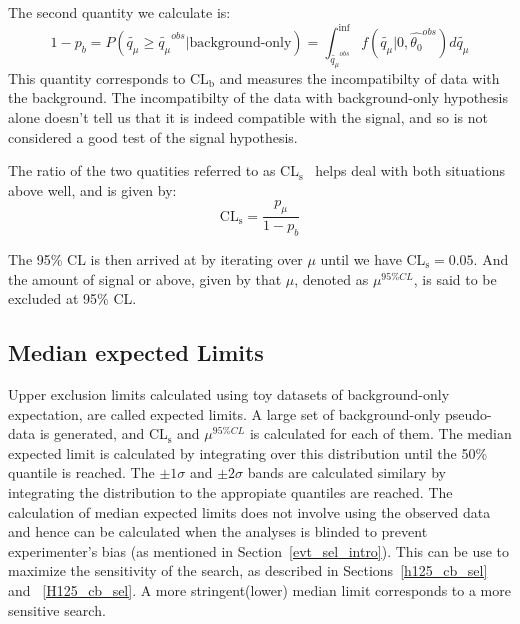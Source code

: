 The second quantity we calculate is:
\begin{equation}                                                                                                                          
  \label{eq:pb}                                                     
  1-p_b=P(\tilde{q_\mu}\geq \tilde{q_\mu}^{obs}|\text{background-only})=\int_{\tilde{q_\mu}^{obs}}^{\inf}f(\tilde{q_\mu}|0,\hat{\theta_0}^{obs})d\tilde{q_\mu}                                                                                                            
\end{equation}
This quantity corresponds to CL$_\text{b}$ and measures the incompatibilty of data with the background. The incompatibilty of the data with background-only hypothesis alone doesn't tell us that it is indeed compatible with the signal, and so is not considered a good test of the signal hypothesis.

The ratio of the two quatities referred to as CL$_\text{s}$~\cite{cls1,cls2,cls3} helps deal with both situations above well, and is given by:
\begin{equation}                                                                                                                          
  \label{eq:cls}                                                                                                                           \text{CL}_\text{s}=\frac{p_\mu}{1-p_b}
\end{equation}

The 95\% CL is then arrived at by iterating over $\mu$ until we have CL$_\text{s}=0.05$. And the amount of signal or above, given by that $\mu$, denoted as $\mu^{95\%CL}$, is said to be excluded at 95\% CL. 

\subsection{Median expected Limits}

Upper exclusion limits calculated using toy datasets of background-only expectation, are called expected limits. A large set of background-only pseudo-data is generated, and CL$_\text{s}$ and $\mu^{95\%CL}$ is calculated for each of them. The median expected limit is calculated by integrating over this distribution until the 50\% quantile is reached. The $\pm 1\sigma$ and $\pm 2\sigma$ bands are calculated similary by integrating the distribution to the appropiate quantiles are reached. The calculation of median expected limits does not involve using the observed data and hence can be calculated when the analyses is blinded to prevent experimenter's bias (as mentioned in Section~\ref{evt_sel_intro}). This can be use to maximize the sensitivity of the search, as described in Sections~\ref{h125_cb_sel} and ~\ref{H125_cb_sel}. A more stringent(lower) median limit corresponds to a more sensitive search.  


